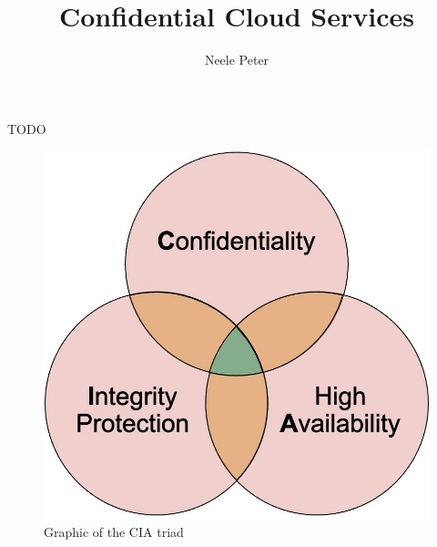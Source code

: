 \documentclass[sigconf]{acmart}
\title{Confidential Cloud Services}
\author{Neele Peter}
\affiliation{%
  \institution{Friedrich-Alexander-Universit\"at Erlangen-N\"urnberg}
  \country{}}
\begin{document}
	
	
\maketitle


TODO

	



\begin{figure}[t]
	\includegraphics[scale=0.25]{pictures/cia_triad}
	\caption{Graphic of the CIA triad}
	\label{cia}
\end{figure}









\newpage


	
\end{document}
